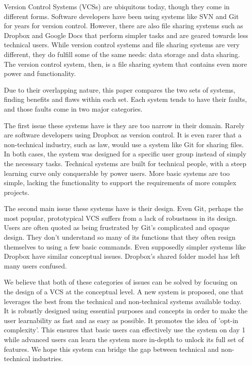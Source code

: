 Version Control Systems (VCSs) are ubiquitous today, though they come in different forms. Software developers have been using systems like SVN and Git for years for version control. However, there are also file sharing systems such as Dropbox and Google Docs that perform simpler tasks and are geared towards less technical users. While version control systems and file sharing systems are very different, they do fulfill some of the same needs: data storage and data sharing. The version control system, then, is a file sharing system that contains even more power and functionality.

Due to their overlapping nature, this paper compares the two sets of systems, finding benefits and flaws within each set. Each system tends to have their faults, and those faults come in two major categories.

The first issue these systems have is they are too narrow in their domain. Rarely are software developers using Dropbox as version control. It is even rarer that a non-technical industry, such as law, would use a system like Git for sharing files. In both cases, the system was designed for a specific user group instead of simply the necessary tasks. Technical systems are built for technical people, with a steep learning curve only conquerable by power users. More basic systems are too simple, lacking the functionality to support the requirements of more complex projects.

The second main issue these systems have is their design. Even Git, perhaps the most popular, prototypical VCS suffers from a lack of robustness in its design. Users are often quoted as being frustrated by Git's complicated and opaque design. They don’t understand so many of its functions that they often resign themselves to using a few basic commands. Even supposedly simpler systems like Dropbox have similar conceptual issues. Dropbox's shared folder model has left many users confused. 

We believe that both of these categories of issues can be solved by focusing on the design of a VCS at the conceptual level. A new system is proposed, one that leverages the best from the technical and non-technical systems available today. It is robustly designed using essential purposes and concepts in order to make the user learnability as fast and as easy as possible. It promotes the idea of 'opt-in complexity'. This ensures that basic users can effectively use the system on day 1 while advanced users can learn the system more in-depth to unlock its full set of features. We hope this system can bridge the gap between technical and non-technical industries. 

